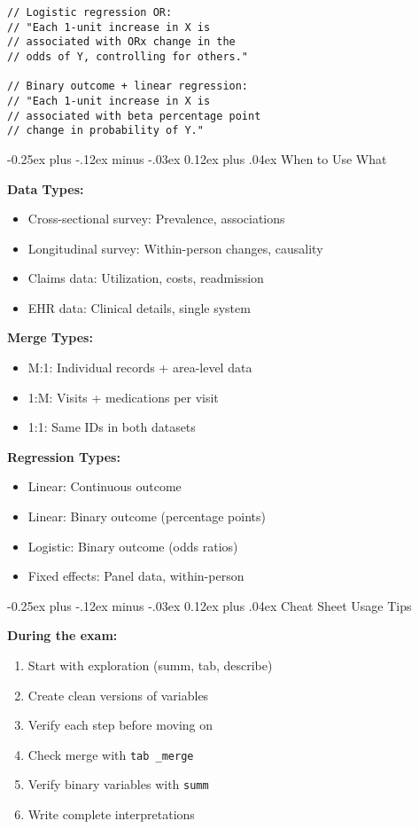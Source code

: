 ﻿\documentclass[8pt,letterpaper]{article}
\makeatletter
\renewcommand{\subsection}{\@startsection{subsection}{2}{0mm}%
                                {-0.25ex plus -.12ex minus -.03ex}%
                                {0.12ex plus .04ex}%
                                {\normalfont\fontsize{8pt}{8pt}\selectfont\bfseries\color{myblue}}}
\makeatother
\begin{document}
\begin{multicols}{2}
\begin{lstlisting}
// Logistic regression OR:
// "Each 1-unit increase in X is
// associated with ORx change in the
// odds of Y, controlling for others."

// Binary outcome + linear regression:
// "Each 1-unit increase in X is
// associated with beta percentage point
// change in probability of Y."
\end{lstlisting}

\subsection{When to Use What}

\textbf{Data Types:}
\begin{itemize}
\item Cross-sectional survey: Prevalence, associations
\item Longitudinal survey: Within-person changes, causality
\item Claims data: Utilization, costs, readmission
\item EHR data: Clinical details, single system
\end{itemize}

\textbf{Merge Types:}
\begin{itemize}
\item M:1: Individual records + area-level data
\item 1:M: Visits + medications per visit
\item 1:1: Same IDs in both datasets
\end{itemize}

\textbf{Regression Types:}
\begin{itemize}
\item Linear: Continuous outcome
\item Linear: Binary outcome (percentage points)
\item Logistic: Binary outcome (odds ratios)
\item Fixed effects: Panel data, within-person
\end{itemize}

\subsection{Cheat Sheet Usage Tips}
\begin{tipbox}
\textbf{During the exam:}
\begin{enumerate}
\item Start with exploration (summ, tab, describe)
\item Create clean versions of variables
\item Verify each step before moving on
\item Check merge with \texttt{tab \_merge}
\item Verify binary variables with \texttt{summ}
\item Write complete interpretations
\end{enumerate}
\end{tipbox}


\end{multicols}
\end{document}
